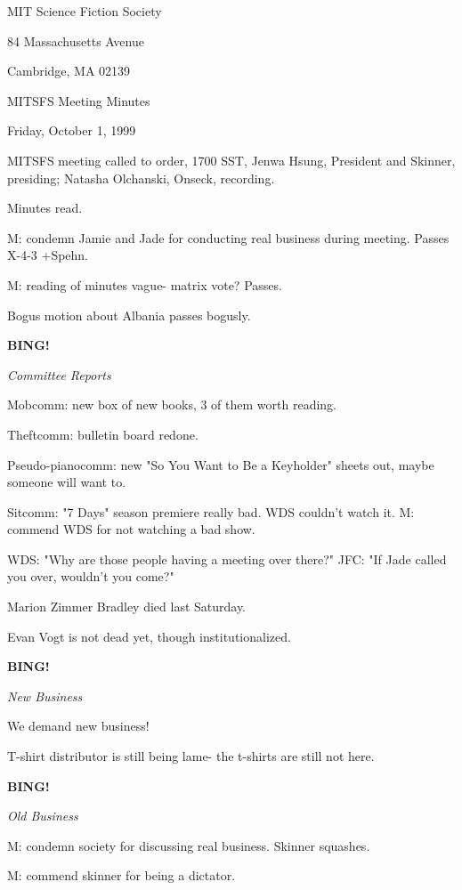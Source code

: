\documentclass[12pt]{article}
\newcommand{\bing}{{\bf BING!} }
\newcommand{\goto}[1]{\bing \vskip 12pt \centerline{{\em{#1}}}}
\begin{document}
\begin{center}

MIT Science Fiction Society 

84 Massachusetts Avenue

Cambridge, MA 02139

\vspace{12pt}

MITSFS Meeting Minutes 

Friday, October 1, 1999

\end{center}
 
\vspace{18pt}

\setlength{\parskip}{6pt}

\noindent
MITSFS meeting called to order, 1700 SST,
Jenwa Hsung, President and Skinner, presiding; Natasha Olchanski, Onseck, recording.

Minutes read.

M: condemn Jamie and Jade for conducting real business during meeting. Passes X-4-3 +Spehn.

M: reading of minutes vague- matrix vote? Passes.

Bogus motion about Albania passes bogusly.

\goto{Committee Reports}

Mobcomm: new box of new books, 3 of them worth reading.

Theftcomm: bulletin board redone.

Pseudo-pianocomm: new "So You Want to Be a Keyholder" sheets out, maybe someone will want to.

Sitcomm: "7 Days" season premiere really bad. WDS couldn't watch it. M: commend WDS for not watching a bad show.

WDS: "Why are those people having a meeting over there?" JFC: "If Jade called you over, wouldn't you come?"

Marion Zimmer Bradley died last Saturday.

Evan Vogt is not dead yet, though institutionalized.

\goto{New Business}

We demand new business!

T-shirt distributor is still being lame- the t-shirts are still not here.

\goto{Old Business}

M: condemn society for discussing real business. Skinner squashes.

M: commend skinner for being a dictator.
\end{document}
